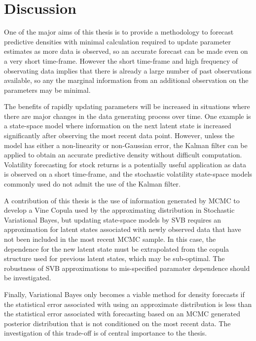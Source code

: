\documentclass[12pt,a4paper]{article}%
\numberwithin{equation}{section}
\begin{document}
\section{Discussion} \label{sec:Discussion}

One of the major aims of this thesis is to provide a methodology to forecast predictive densities with minimal calculation required to update parameter estimates as more data is observed, so an accurate forecast can be made even on a very short time-frame. However the short time-frame and high frequency of observating data implies that there is already a large number of past observations available, so any the marginal information from an additional observation on the parameters may be minimal. 

The benefits of rapidly updating parameters will be increased in situations where there are major changes in the data generating process over time. One example is a state-space model where information on the next latent state is increased significantly after observing the most recent data point. However, unless the model has either a non-linearity or non-Gaussian error, the Kalman filter can be applied to obtain an accurate predictive density without difficult computation. Volatility forecasting for stock returns is a potentially useful application as data is observed on a short time-frame, and the stochastic volatility state-space models commonly used do not admit the use of the Kalman filter. 

A contribution of this thesis is the use of information generated by MCMC to develop a Vine Copula used by the approximating distribution in Stochastic Variational Bayes, but updating state-space models by SVB requires an approximation for latent states associated with newly observed data that have not been included in the most recent MCMC sample. In this case, the dependence for the new latent state must be extrapolated from the copula structure used for previous latent states, which may be sub-optimal. The robustness of SVB approximations to mis-specified paramater dependence should be investigated.

Finally, Variational Bayes only becomes a viable method for density forecasts if the statistical error associated with using an approximate distribution is less than the statistical error associated with forecasting based on an MCMC generated posterior distribution that is not conditioned on the most recent data. The investigation of this trade-off is of central importance to the thesis. 
\end{document}
